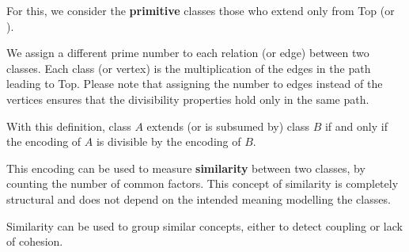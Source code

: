 For this, we consider the \textbf{primitive} classes those who extend only from Top (or ).

We assign a different prime number to each relation (or edge) between two classes.
Each class (or vertex) is the multiplication of the edges in the path leading to Top.
Please note that assigning the number to edges instead of the vertices ensures that the divisibility properties hold only in the same path.

With this definition, class $A$ extends (or is subsumed by) class $B$ if and only if the encoding of $A$ is divisible by the encoding of $B$.

This encoding can be used to measure \textbf{similarity} between two classes, by counting the number of common factors.
This concept of similarity is completely structural and does not depend on the intended meaning modelling the classes.

Similarity can be used to group similar concepts, either to detect coupling or lack of cohesion.

